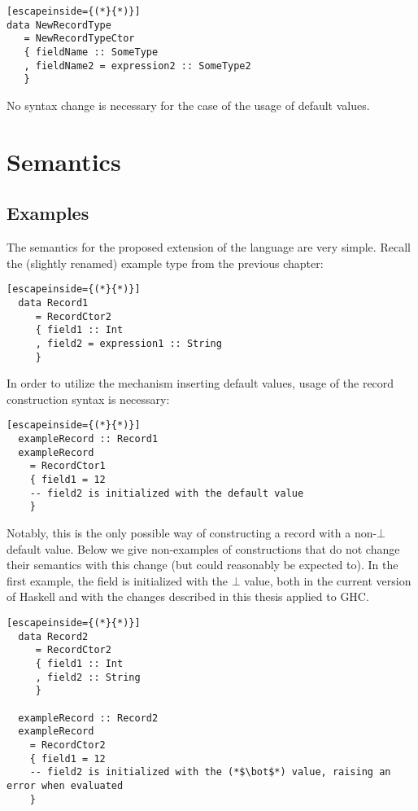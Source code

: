 \documentclass[en]{pracamgr}
\begin{document}
\begin{lstlisting}[escapeinside={(*}{*)}]
data NewRecordType
   = NewRecordTypeCtor 
   { fieldName :: SomeType 
   , fieldName2 = expression2 :: SomeType2
   }
\end{lstlisting}
No syntax change is necessary for the case of the usage of default values.


\chapter{Semantics}
\section{Examples}
The semantics for the proposed extension of the language are very simple.
Recall the (slightly renamed) example type from the previous chapter:

\begin{lstlisting}[escapeinside={(*}{*)}]
  data Record1
     = RecordCtor2 
     { field1 :: Int
     , field2 = expression1 :: String
     }
\end{lstlisting}
  
In order to utilize the mechanism inserting default values, usage of the record construction syntax is necessary:

\begin{lstlisting}[escapeinside={(*}{*)}]
  exampleRecord :: Record1
  exampleRecord 
    = RecordCtor1
    { field1 = 12
    -- field2 is initialized with the default value
    }
\end{lstlisting}

Notably, this is the only possible way of constructing a record with a non-$\bot$ default value.
Below we give non-examples of constructions that do not change their semantics with this change (but could reasonably be expected to).
In the first example, the field is initialized with the $\bot$ value, both in the current version of Haskell and with the changes described in this thesis applied to GHC.

\begin{lstlisting}[escapeinside={(*}{*)}]
  data Record2
     = RecordCtor2 
     { field1 :: Int
     , field2 :: String
     }  

  exampleRecord :: Record2
  exampleRecord 
    = RecordCtor2 
    { field1 = 12
    -- field2 is initialized with the (*$\bot$*) value, raising an error when evaluated
    }

\end{lstlisting}
\end{document}
